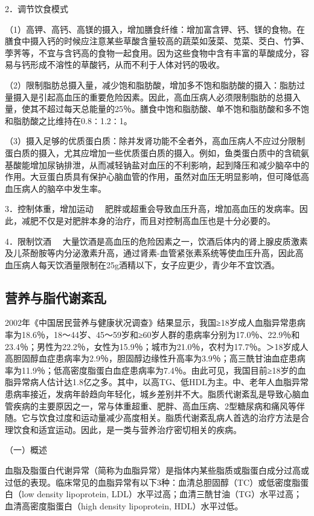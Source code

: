 {2．调节饮食模式}

（1）高钾、高钙、高镁的摄入，增加膳食纤维：增加富含钾、钙、镁的食物。在膳食中摄入钙的时候应注意某些草酸含量较高的蔬菜如菠菜、苋菜、茭白、竹笋、荸荠等，不宜与含钙高的食物一起食用。因为这些食物中含有丰富的草酸成分，容易与钙形成不溶性的草酸钙，从而不利于人体对钙的吸收。

（2）限制脂肪总摄入量，减少饱和脂肪酸，增加多不饱和脂肪酸的摄入：脂肪过量摄入是引起高血压的重要危险因素。因此，高血压病人必须限制脂肪的总摄入量，使其不超过每天总能量的25％。膳食中饱和脂肪酸、单不饱和脂肪酸和多不饱和脂肪酸之比维持在0.8∶1.2∶1。

（3）摄入足够的优质蛋白质：除并发肾功能不全者外，高血压病人不应过分限制蛋白质的摄入，尤其应增加一些优质蛋白质的摄入。例如，鱼类蛋白质中的含硫氨基酸能增加尿钠排泄，从而减轻钠盐对血压的不利影响，起到降压和减少脑卒中的作用。大豆蛋白质具有保护心脑血管的作用，虽然对血压无明显影响，但可降低高血压病人的脑卒中发生率。

{3．控制体重，增加运动}
　肥胖或超重会导致血压升高，增加高血压的发病率。因此，减肥不仅是对肥胖本身的治疗，而且对控制高血压也是十分必要的。

{4．限制饮酒}
　大量饮酒是高血压的危险因素之一，饮酒后体内的肾上腺皮质激素及儿茶酚胺等内分泌激素升高，通过肾素-血管紧张素系统等使血压升高，因此高血压病人每天饮酒量限制在25g酒精以下，女子应更少，青少年不宜饮酒。

\hypertarget{text00004.htmlux5cux23mllj9}{%
\subsection{营养与脂代谢紊乱}\label{text00004.htmlux5cux23mllj9}}

2002年《中国居民营养与健康状况调查》结果显示，我国≥18岁成人血脂异常患病率为18.6％，18～44岁、45～59岁和≥60岁人群的患病率分别为17.0％、22.9％和23.4％；男性为22.2％，女性为15.9％；城市为21.0％，农村为17.7％。＞18岁成人高胆固醇血症患病率为2.9％，胆固醇边缘性升高率为3.9％；高三酰甘油血症患病率为11.9％；低高密度脂蛋白血症患病率为7.4％。由此可见，我国目前≥18岁的血脂异常病人估计达1.8亿之多。其中，以高TG、低HDL为主。中、老年人血脂异常患病率接近，发病年龄趋向年轻化，城乡差别并不大。脂质代谢紊乱是导致心脑血管疾病的主要原因之一，常与体重超重、肥胖、高血压病、2型糖尿病和痛风等伴随。它与饮食过度和运动量减少高度相关。脂质代谢紊乱病人首选的治疗方法是合理饮食和适宜运动。因此，是一类与营养治疗密切相关的疾病。

（一）概述

血脂及脂蛋白代谢异常（简称为血脂异常）是指体内某些脂质或脂蛋白成分过高或过低的表现。临床常见的血脂异常有以下3种：血清总胆固醇（TC）或低密度脂蛋白（low
density lipoprotein,
LDL）水平过高；血清三酰甘油（TG）水平过高；血清高密度脂蛋白（high
density lipoprotein, HDL）水平过低。

